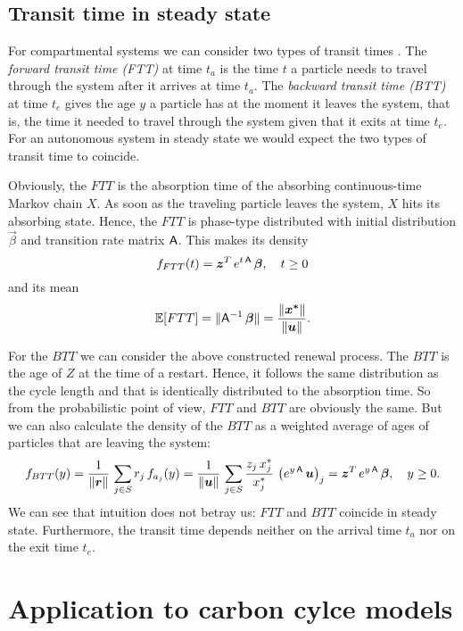 \documentclass[smallextended]{svjour3}
\newcommand{\E}{\mathbb{E}}
\newcommand{\suml}{\sum\limits}
\begin{document}
\subsection{Transit time in steady state}

For compartmental systems we can consider two types of transit times \citep{Nir1975Tellus}.
The \emph{forward transit time (FTT)} at time $t_a$ is the time $t$ a particle needs to travel through the system after it arrives at time $t_a$.
The \emph{backward transit time (BTT)} at time $t_e$ gives the age $y$ a particle has at the moment it leaves the system, that is, the time it needed to travel through the system given that it exits at time $t_e$.
For an autonomous system in steady state we would expect the two types of transit time to coincide.

Obviously, the $FTT$ is the absorption time of the absorbing continuous-time Markov chain $X$.
As soon as the traveling particle leaves the system, $X$ hits its absorbing state.
Hence, the $FTT$ is phase-type distributed with initial distribution $\vec{\beta}$ and transition rate matrix $\mathsf{A}$.
This makes its density
\[
    f_{FTT}(t) = \vec{z}^T\,e^{t\,\tens{A}}\,\vec{\beta},\quad t\geq0
\]
and its mean
\begin{equation}\label{eqn:EFTT}
    \E[FTT] = \|\tens{A}^{-1}\,\vec{\beta}\|=\frac{\|\vec{x^\ast}\|}{\|\vec{u}\|}.
\end{equation}

For the $BTT$ we can consider the above constructed renewal process.
The $BTT$ is the age of $Z$ at the time of a restart.
Hence, it follows the same distribution as the cycle length and that is identically distributed to the absorption time.
So from the probabilistic point of view, $FTT$ and $BTT$ are obviously the same.
But we can also calculate the density of the $BTT$ as a weighted average of ages of particles that are leaving the system:
\[
    f_{BTT}(y) = \frac{1}{\|\vec{r}\|}\,\suml_{j\in S} r_j\,f_{a_j}(y) = \frac{1}{\|\vec{u}\|}\,\suml_{j\in S} \frac{z_j\,x^\ast_j}{x_j^\ast}\,\left(e^{y\,\tens{A}}\,\vec{u}\right)_j = \vec{z}^T\,e^{y\,\tens{A}}\,\vec{\beta},\quad y\geq0.
\]
We can see that intuition does not betray us: $FTT$ and $BTT$ coincide in steady state.
Furthermore, the transit time depends neither on the arrival time $t_a$ nor on the exit time $t_e$.

\section{Application to carbon cylce models\label{sec:apps}}
\end{document}
